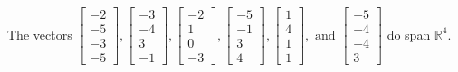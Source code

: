 \begin{exercise}
\begin{exerciseStatement}
  \end{exerciseStatement}
  \begin{exerciseAnswer}
   The vectors \(\left[\begin{array}{r}
-2 \\
-5 \\
-3 \\
-5
\end{array}\right] , \left[\begin{array}{r}
-3 \\
-4 \\
3 \\
-1
\end{array}\right] , \left[\begin{array}{r}
-2 \\
1 \\
0 \\
-3
\end{array}\right] , \left[\begin{array}{r}
-5 \\
-1 \\
3 \\
4
\end{array}\right] , \left[\begin{array}{r}
1 \\
4 \\
1 \\
1
\end{array}\right] , \text{ and } \left[\begin{array}{r}
-5 \\
-4 \\
-4 \\
3
\end{array}\right]\) 
  	 do  
	span \(\mathbb{R}^4\).
  


  \end{exerciseAnswer}
\end{exercise}